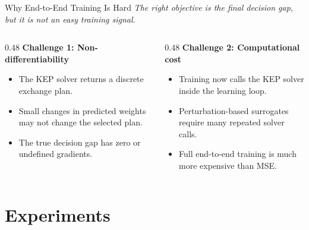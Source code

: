 \documentclass[aspectratio=169]{beamer}
\begin{document}
\begin{frame}{Why End-to-End Training Is Hard}
  \footnotesize
  \centering
  \textit{The right objective is the final decision gap, but it is not an easy training signal.}

  \vspace{0.8em}
  \begin{columns}[T,onlytextwidth]
    \begin{column}{0.48\textwidth}
      \textbf{\textcolor{kepred}{Challenge 1: Non-differentiability}}
      \begin{itemize}\setlength{\itemsep}{0.35em}
        \item The KEP solver returns a discrete exchange plan.
        \item Small changes in predicted weights may not change the selected plan.
        \item The true decision gap has zero or undefined gradients.
      \end{itemize}
    \end{column}

    \begin{column}{0.48\textwidth}
      \textbf{\textcolor{keporange}{Challenge 2: Computational cost}}
      \begin{itemize}\setlength{\itemsep}{0.35em}
        \item Training now calls the KEP solver inside the learning loop.
        \item Perturbation-based surrogates require many repeated solver calls.
        \item Full end-to-end training is much more expensive than MSE.
      \end{itemize}
    \end{column}
  \end{columns}

  \vspace{1.1em}
\end{frame}

\section{Experiments}
\end{document}
